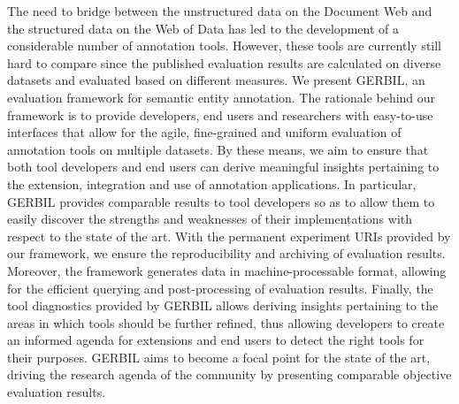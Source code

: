 % 
The need to bridge between the unstructured data on the Document Web and the structured data on the Web of Data has led to the development of a considerable number of annotation tools. However, these tools are currently still hard to compare since the published evaluation results are calculated on diverse datasets and evaluated based on different measures. 
We present GERBIL, an evaluation framework for semantic entity annotation. The rationale behind our framework is to provide developers, end users and researchers with easy-to-use interfaces that allow for the agile, fine-grained and uniform evaluation of annotation tools on multiple datasets. By these means, we aim to ensure that both tool developers and end users can derive meaningful insights pertaining to the extension, integration and use of annotation applications. In particular, GERBIL provides comparable results to tool developers so as to allow them to easily discover the strengths and weaknesses of their implementations with respect to the state of the art. With the permanent experiment URIs provided by our framework, we ensure the reproducibility and archiving of evaluation results. Moreover, the framework generates data in machine-processable format, allowing for the efficient querying and post-processing of evaluation results. Finally, the tool diagnostics provided by GERBIL allows deriving insights pertaining to the areas in which tools should be further refined, thus allowing developers to create an informed agenda for extensions and end users to detect the right tools for their purposes. GERBIL aims to become a focal point for the state of the art, driving the research agenda of the community by presenting comparable objective evaluation results.

